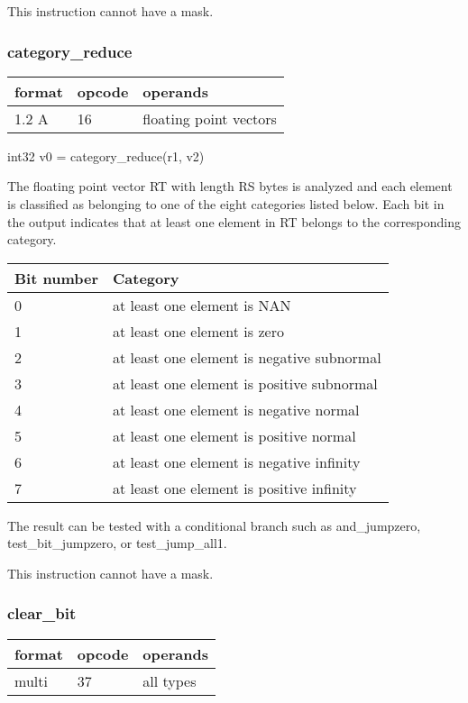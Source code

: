 \documentclass[forwardcom.tex]{subfiles}
\begin{document}
This instruction cannot have a mask.
\vspace{2mm}

\subsubsection{category\_reduce}
\label{table:categoryReduceInstruction}
\begin{tabular}{|p{12mm}|p{12mm}|p{110mm}|}
\hline
\bfseries format & \bfseries opcode & \bfseries operands \\ \hline
1.2 A & 16 & floating point vectors \\ \hline
\end{tabular}
\vspace{2mm}

int32 v0 = category\_reduce(r1, v2)
\vspace{2mm}

The floating point vector RT with length RS bytes is analyzed and each element is classified as belonging to one of the eight categories listed below. Each bit in the output indicates that at least one element in RT belongs to the corresponding category.
\vspace{2mm}

\begin{tabular}{|p{24mm}|p{115mm}|}
\hline
\bfseries Bit number & \bfseries Category \\ \hline
0 & at least one element is NAN \\
1 & at least one element is zero \\
2 & at least one element is negative subnormal \\
3 & at least one element is positive subnormal \\
4 & at least one element is negative normal \\
5 & at least one element is positive normal \\
6 & at least one element is negative infinity \\
7 & at least one element is positive infinity \\
\hline
\end{tabular}
\vspace{2mm}

The result can be tested with a conditional branch such as and\_jumpzero, test\_bit\_jumpzero, or test\_jump\_all1.
\vspace{2mm}

This instruction cannot have a mask.

\subsubsection{clear\_bit}
\label{table:clearBitInstruction}
\begin{tabular}{|p{12mm}|p{12mm}|p{110mm}|}
\hline
\bfseries format & \bfseries opcode & \bfseries operands \\ \hline
multi & 37 & all types \\ \hline
\end{tabular}
\vspace{2mm}
\end{document}
